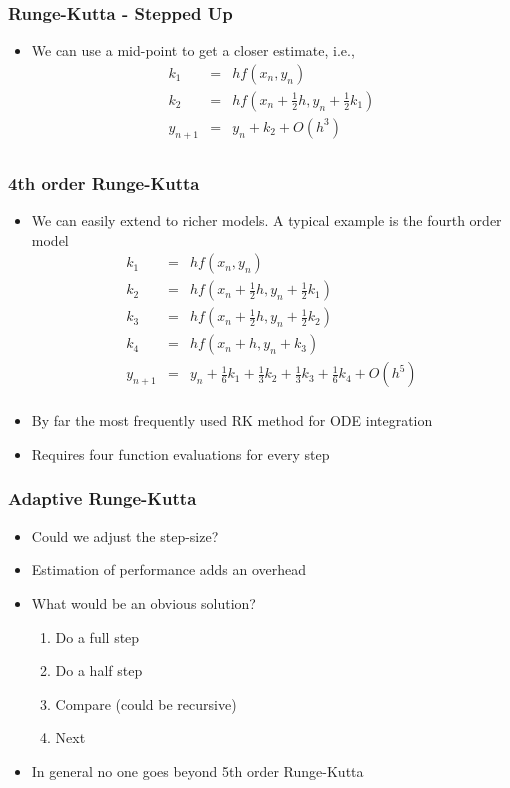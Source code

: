 \documentclass[10pt]{beamer}
\begin{document}
\begin{frame}
  \frametitle{Runge-Kutta - Stepped Up}
  \begin{itemize}
  \item We can use a mid-point to get a closer estimate, i.e.,
    \[
      \begin{array}{rcl}
        k_1 & = & h f(x_n, y_n)\\
        k_2 & = & h f( x_n + \frac{1}{2} h, y_n + \frac{1}{2} k_1)\\
        y_{n+1} & = & y_n + k_2 + O(h^3)\\
      \end{array}
    \]
  \end{itemize}
\end{frame}

\begin{frame}
  \frametitle{4th order Runge-Kutta}
  \begin{itemize}
  \item We can easily extend to richer models. A typical example is the fourth order model
    \[
      \begin{array}{rcl}
        k_1 & = & h f( x_n, y_n)\\
        k_2 & = & h f( x_n + \frac{1}{2} h, y_n + \frac{1}{2} k_1)\\ 
        k_3 & = & h f( x_n + \frac{1}{2} h, y_n + \frac{1}{2} k_2)\\
        k_4 & = & h f( x_n + h, y_n + k_3)\\
        y_{n+1} & = & y_n + \frac{1}{6} k_1 + \frac{1}{3} k_2 + \frac{1}{3} k_3 + \frac{1}{6} k_4 + O(h^5)\\        
      \end{array}
    \]
  \item By far the most frequently used RK method for ODE integration
  \item Requires four function evaluations for every step
  \end{itemize}
\end{frame}

\begin{frame}
  \frametitle{Adaptive Runge-Kutta}
  \begin{itemize}
  \item Could we adjust the step-size? 
  \item Estimation of performance adds an overhead
  \item What would be an obvious solution? \pause
    \begin{enumerate}
    \item Do a full step
    \item Do a half step
    \item Compare (could be recursive)
    \item Next
    \end{enumerate}
  \item In general no one goes beyond 5th order Runge-Kutta
  \end{itemize}
\end{frame}
\end{document}

